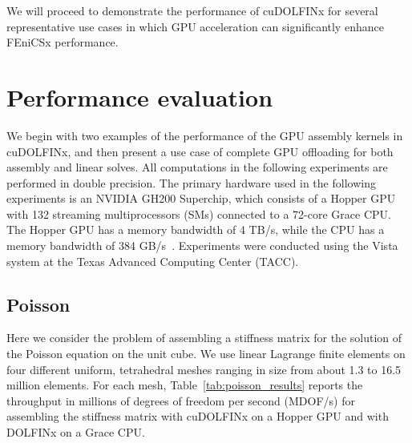 We will proceed to demonstrate the performance of cuDOLFINx for several representative use cases in which GPU acceleration can significantly enhance FEniCSx performance.

\section*{Performance evaluation}
We begin with two examples of the performance of the GPU assembly kernels in cuDOLFINx, and then present a use case of complete GPU offloading for both assembly and linear solves. All computations in the following experiments are performed in double precision. The primary hardware used in the following experiments is an NVIDIA GH200 Superchip, which consists of a Hopper GPU with 132 streaming multiprocessors (SMs) connected to a 72-core Grace CPU. The Hopper GPU has a memory bandwidth of 4 TB/s, while the CPU has a memory bandwidth of 384 GB/s~\citep{gh200specs}. Experiments were conducted using the Vista system at the Texas Advanced Computing Center (TACC).

\subsection*{Poisson}
Here we consider the problem of assembling a stiffness matrix for the solution of the Poisson equation on the unit cube. We use linear Lagrange finite elements on four different uniform, tetrahedral meshes ranging in size from about 1.3 to 16.5 million elements.  For each mesh, Table~\ref{tab:poisson_results} reports the throughput in millions of degrees of freedom per second (MDOF/s) for assembling the stiffness matrix with cuDOLFINx on a Hopper GPU and with DOLFINx on a Grace CPU.

